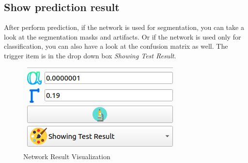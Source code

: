 \documentclass[12pt]{article}
\begin{document}
\subsection{Show prediction result}
After perform prediction, if the network is used for segmentation, you can take a look at the segmentation masks and artifacts. Or if the network is used only for classification, you can also have a look at the confusion matrix as well. The trigger item is in the drop down box \textit{Showing Test Result}.
\begin{figure}[htbp]	
	\centering
	\includegraphics{visualization_out.png}
	\caption[Network Result Visualization]{Network Result Visualization}
	\label{fig:visualization_out}
\end{figure}
\end{document}

